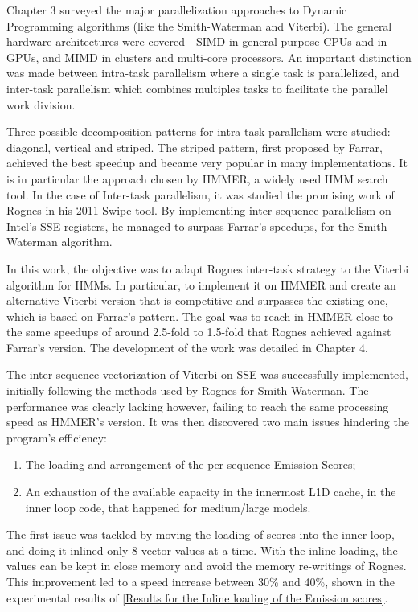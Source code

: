 Chapter 3 surveyed the major parallelization approaches to Dynamic Programming algorithms (like the Smith-Waterman and Viterbi). The general hardware architectures were covered - SIMD in general purpose CPUs and in GPUs, and MIMD in clusters and multi-core processors. An important distinction was made between intra-task parallelism where a single task is parallelized, and inter-task parallelism which combines multiples tasks to facilitate the parallel work division. 

Three possible decomposition patterns for intra-task parallelism were studied: diagonal, vertical and striped. The striped pattern, first proposed by Farrar, achieved the best speedup and became very popular in many implementations. It is in particular the approach chosen by HMMER, a widely used HMM search tool. In the case of Inter-task parallelism, it was studied the promising work of Rognes in his 2011 Swipe tool. By implementing inter-sequence parallelism on Intel's SSE registers, he managed to surpass Farrar's speedups, for the Smith-Waterman algorithm.

In this work, the objective was to adapt Rognes inter-task strategy to the Viterbi algorithm for HMMs. In particular, to implement it on HMMER and create an alternative Viterbi version that is competitive and surpasses the existing one, which is based on Farrar's pattern. The goal was to reach in HMMER close to the same speedups of around 2.5-fold to 1.5-fold that Rognes achieved against Farrar's version. The development of the work was detailed in Chapter 4.

The inter-sequence vectorization of Viterbi on SSE was successfully implemented, initially following the methods used by Rognes for Smith-Waterman. The performance was clearly lacking however, failing to reach the same processing speed as HMMER's version.
It was then discovered two main issues hindering the program's efficiency: 
\begin{enumerate}
\item The loading and arrangement of the per-sequence Emission Scores;
\item An exhaustion of the available capacity in the innermost L1D cache, in the inner loop code, that happened for medium/large models.
\end{enumerate}

The first issue was tackled by moving the loading of scores into the inner loop, and doing it inlined only 8 vector values at a time. With the inline loading, the values can be kept in close memory and avoid the memory re-writings of Rognes. This improvement led to a speed increase between 30\% and 40\%, shown in the experimental results of \autoref{Results for the Inline loading of the Emission scores}.


